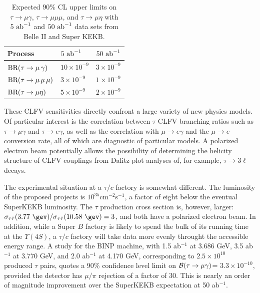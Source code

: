 \begin{table}[!b]
  \caption{
    \label{tab:LFVExptSensitivities-BelleII}
    Expected $90\%$ CL upper limits
    on $\tau\to\mu\gamma$, $\tau\to \mu\mu\mu$, and $\tau\to \mu\eta$
    with $5 \ {\rm ab}^{-1}$ and  $50 \ {\rm ab}^{-1}$ data sets from Belle II and  Super KEKB.
  }
  \begin{center}
    \begin{tabular}{lll}
      \hline \hline
Process & $5\ {\rm ab}^{-1}$ & $50\ {\rm ab}^{-1}$  \\
      \hline
      $\BR(\tau \to \mu\,\gamma) \rule{0pt}{2.6ex}$ &  $10 \times 10^{-9}$ &  $3 \times 10^{-9}$  \\
      $\mbox{\rm BR}(\tau \to \mu\, \mu\, \mu)$ &  $3 \times 10^{-9}$ & $1 \times 10^{-9}$  \\
      $\mbox{\rm BR}(\tau \to \mu \eta)$             &  $5 \times 10^{-9}$ & $2\times 10^{-9}$    \\
 \hline\hline
    \end{tabular}
  \end{center}
\end{table}


These CLFV sensitivities directly confront a large variety of new
physics models. Of particular interest is the correlation between
$\tau$ CLFV branching ratios such as $\tau\to \mu\gamma$ and $\tau\to e
\gamma$, as well as the correlation with $\mu\to e \gamma$ and the
$\mu\to e$ conversion rate, all of which are diagnostic of particular
models.  A polarized electron beam potentially allows the possibility of determining the helicity structure of CLFV couplings from Dalitz plot analyses of, for example, $\tau \to 3\ell$ decays.

The experimental situation at a $\tau/c$ factory is somewhat different. The luminosity of the proposed projects is $10^{35}$cm$^{-2}$s$^{-1}$, a factor of eight below the eventual SuperKEKB luminosity. The $\tau$ production cross section is, however, larger: $\sigma_{\tau\bar{\tau}}(3.77\  \gev)/\sigma_{\tau\bar{\tau}}(10.58\  \gev)=3$, and both have a polarized electron beam. In addition, while a Super $B$ factory is likely to spend the bulk of its running time at the $\Upsilon(4S)$, a $\tau/c$ factory will take data more evenly throught the accessible energy range.  A study for the BINP machine, with 1.5 ab$^{-1}$ at 3.686 GeV,
3.5 ab$^{-1}$ at 3.770 GeV, and 2.0 ab$^{-1}$ at 4.170 GeV, 
corresponding to  $2.5\times 10^{10}$ produced $\tau$ pairs, quotes a 90\% confidence level limit on $\cal{B}(\tau\rightarrow\mu\gamma)$= $3.3\times 10^{-10}$, provided the detector has $\mu/\pi$ rejection of a factor of 30. This is nearly an order of magnitude improvement over the SuperKEKB expectation at 50 ab$^{-1}$.

